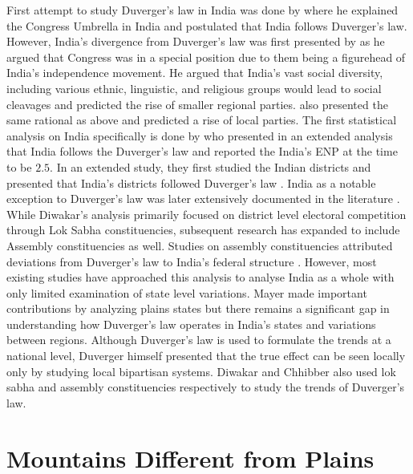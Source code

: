 First attempt to study Duverger's law in India was done by \cite{riker1982two,riker1976number} where he explained the Congress Umbrella in India and postulated that India follows Duverger's law. However, India's divergence from Duverger's law was first presented by \cite{lijphart1994} as he argued that Congress was in a special position due to them being a figurehead of India's independence movement. He argued that India's vast social diversity, including various ethnic, linguistic, and religious groups would lead to social cleavages and predicted the rise of smaller regional parties. \cite{taagepera1989seats,sridharan1997duverger} also presented the same rational as above and predicted a rise of local parties. The first statistical analysis on India specifically is done by \cite{chhibber1998party} who presented in an extended analysis that India follows the Duverger's law and reported the India's ENP at the time to be $2.5$. In an extended study, they first studied the Indian districts and presented that India's districts followed Duverger's law \citep{chhibber2009formation}. 
India as a notable exception to Duverger's law was later extensively documented in the literature \citep{diwakar2007duverger, diwakar2010party, mayer2013gross,carneggie_duverger}. While Diwakar's analysis primarily focused on district level electoral competition through Lok Sabha constituencies, subsequent research has expanded to include Assembly constituencies as well. Studies on assembly constituencies attributed deviations from Duverger's law to India's federal structure \citep{chhibber2006duvergerian}. However, most existing studies have approached this analysis to analyse India as a whole with only limited examination of state level variations. Mayer made important contributions by analyzing plains states but there remains a significant gap in understanding how Duverger's law operates in India's states and variations between regions. Although Duverger’s law is used to formulate the trends at a national level, Duverger himself presented that the true effect can be seen locally only by studying local bipartisan systems. Diwakar and Chhibber also used lok sabha and assembly constituencies respectively to study the trends of Duverger’s law. 

\section{Mountains Different from Plains}
